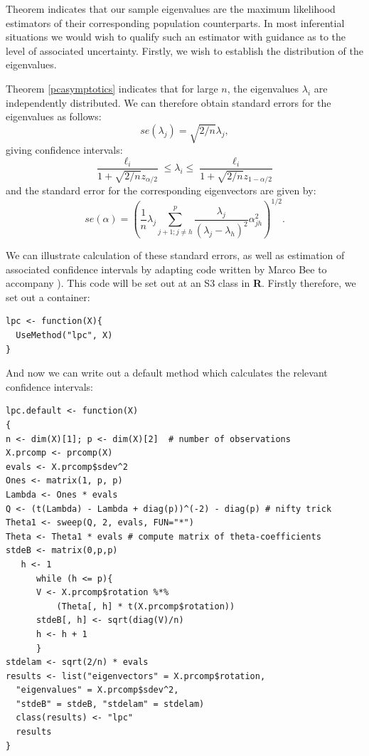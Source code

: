 

Theorem \label{th:evalmle} indicates that our sample eigenvalues are the maximum likelihood estimators of their corresponding population counterparts.   In most inferential situations we would wish to qualify such an estimator with guidance as to the level of associated uncertainty.   Firstly, we wish to establish the distribution of the eigenvalues.



Theorem \ref{pcasymptotics} indicates that for large $n$, the eigenvalues $\lambda_{i}$ are independently distributed.   We can therefore obtain standard errors for the eigenvalues as follows:
\begin{displaymath}
se(\lambda_{j}) = \sqrt{2/n} \lambda_{j},
\end{displaymath}
giving confidence intervals:
\begin{displaymath}
\frac{\ell_{i}}{1 + \sqrt{2/n} z_{\alpha/2}} \leq \lambda_{i} \leq \frac{\ell_{i}}{1 + \sqrt{2/n} z_{1-\alpha/2}}
\end{displaymath}
and the standard error for the corresponding eigenvectors are given by: 
\begin{displaymath}
se(\alpha) = \left( \frac{1}{n} \lambda_{j} \sum_{j+1; j \neq h}^{p} \frac{\lambda_{j}}{(\lambda_{j} - \lambda_{h})^2} \alpha_{jh}^{2} \right)^{1/2}.
\end{displaymath}


We can illustrate calculation of these standard errors, as well as estimation of associated confidence intervals by adapting code written by Marco Bee  to accompany \cite{Flury:1997}).   This code will be set out at an S3 class in \textbf{R}.   Firstly therefore, we set out a container:
\singlespacing
\begin{verbatim}
lpc <- function(X){
  UseMethod("lpc", X)
}
\end{verbatim}
\onehalfspacing

And now we can write out a default method which calculates the relevant confidence intervals:
\singlespacing
\begin{verbatim}
lpc.default <- function(X)
{
n <- dim(X)[1]; p <- dim(X)[2]  # number of observations 
X.prcomp <- prcomp(X)
evals <- X.prcomp$sdev^2 
Ones <- matrix(1, p, p) 
Lambda <- Ones * evals
Q <- (t(Lambda) - Lambda + diag(p))^(-2) - diag(p) # nifty trick
Theta1 <- sweep(Q, 2, evals, FUN="*") 
Theta <- Theta1 * evals # compute matrix of theta-coefficients
stdeB <- matrix(0,p,p)      
   h <- 1
      while (h <= p){ 
      V <- X.prcomp$rotation %*% 
          (Theta[, h] * t(X.prcomp$rotation))  
      stdeB[, h] <- sqrt(diag(V)/n)
      h <- h + 1 
      }                         
stdelam <- sqrt(2/n) * evals
results <- list("eigenvectors" = X.prcomp$rotation, 
  "eigenvalues" = X.prcomp$sdev^2,
  "stdeB" = stdeB, "stdelam" = stdelam)
  class(results) <- "lpc"
  results
}
\end{verbatim}
\onehalfspacing


